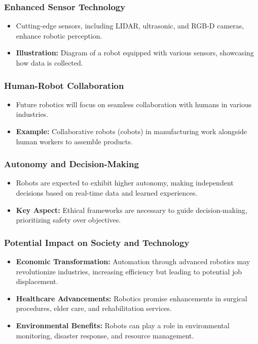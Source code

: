 \documentclass{beamer}
\begin{document}
\begin{frame}[fragile]
    \frametitle{Enhanced Sensor Technology}
    \begin{itemize}
        \item Cutting-edge sensors, including LIDAR, ultrasonic, and RGB-D cameras, enhance robotic perception.
        \item \textbf{Illustration:} Diagram of a robot equipped with various sensors, showcasing how data is collected.
    \end{itemize}
\end{frame}

\begin{frame}[fragile]
    \frametitle{Human-Robot Collaboration}
    \begin{itemize}
        \item Future robotics will focus on seamless collaboration with humans in various industries.
        \item \textbf{Example:} Collaborative robots (cobots) in manufacturing work alongside human workers to assemble products.
    \end{itemize}
\end{frame}

\begin{frame}[fragile]
    \frametitle{Autonomy and Decision-Making}
    \begin{itemize}
        \item Robots are expected to exhibit higher autonomy, making independent decisions based on real-time data and learned experiences.
        \item \textbf{Key Aspect:} Ethical frameworks are necessary to guide decision-making, prioritizing safety over objectives.
    \end{itemize}
\end{frame}

\begin{frame}[fragile]
    \frametitle{Potential Impact on Society and Technology}
    \begin{itemize}
        \item \textbf{Economic Transformation:} Automation through advanced robotics may revolutionize industries, increasing efficiency but leading to potential job displacement.
        \item \textbf{Healthcare Advancements:} Robotics promise enhancements in surgical procedures, elder care, and rehabilitation services.
        \item \textbf{Environmental Benefits:} Robots can play a role in environmental monitoring, disaster response, and resource management.
    \end{itemize}
\end{frame}
\end{document}
